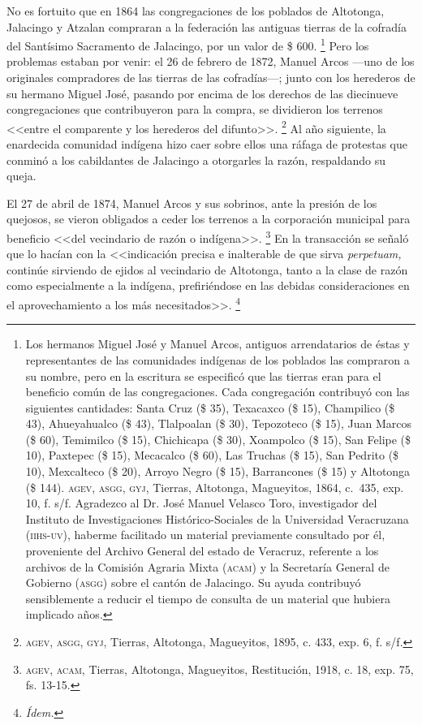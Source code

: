 \documentclass[14pt,twoside,final]{extbook} %
\let\oldfootnote\footnote
\renewcommand\footnote[1]{%
\oldfootnote{\hspace{1mm}#1}}
\begin{document}
No es fortuito que en 1864 las congregaciones de los poblados de Altotonga, Jalacingo y Atzalan compraran a la federación las antiguas tierras de la cofradía del Santísimo Sacramento de Jalacingo, por un valor de \$ 600.\footnote{Los hermanos Miguel José y Manuel Arcos, antiguos arrendatarios de éstas y representantes de las comunidades indígenas de los poblados las compraron a su nombre, pero en la escritura se especificó que las tierras eran para el beneficio común de las congregaciones. Cada congregación contribuyó con las siguientes cantidades: Santa Cruz (\$ 35), Texacaxco (\$ 15), Champilico (\$ 43), Ahueyahualco (\$ 43), Tlalpoalan (\$ 30), Tepozoteco (\$ 15), Juan Marcos (\$ 60), Temimilco (\$ 15), Chichicapa (\$ 30), Xoampolco (\$ 15), San Felipe (\$ 10), Paxtepec (\$ 15), Mecacalco (\$ 60), Las Truchas (\$ 15), San Pedrito (\$ 10), Mexcalteco (\$ 20), Arroyo Negro (\$ 15), Barrancones (\$ 15) y Altotonga (\$ 144). \textsc{agev}, \textsc{asgg}, \textsc{gyj}, Tierras, Altotonga, Magueyitos, 1864, c.~435, exp. 10, f. s/f. Agradezco al Dr. José Manuel Velasco Toro, investigador del Instituto de Investigaciones Histórico-Sociales de la Universidad Veracruzana (\textsc{iihs-uv}), haberme facilitado un material previamente consultado por él, proveniente del Archivo General del estado de Veracruz, referente a los archivos de la Comisión Agraria Mixta (\textsc{acam}) y la Secretaría General de Gobierno (\textsc{asgg}) sobre el cantón de Jalacingo. Su ayuda contribuyó sensiblemente a reducir el tiempo de consulta de un material que hubiera implicado años.} Pero los problemas estaban por venir: el 26 de febrero de 1872, Manuel Arcos ---uno de los originales compradores de las tierras de las cofradías---; junto con los herederos de su hermano Miguel José, pasando por encima de los derechos de las diecinueve congregaciones que contribuyeron para la compra, se dividieron los terrenos <<entre el comparente y los herederos del difunto>>.\footnote{\textsc{agev, asgg, gyj}, Tierras, Altotonga, Magueyitos, 1895, c. 433, exp. 6, f. s/f.} Al año siguiente, la enardecida comunidad indígena hizo caer sobre ellos una ráfaga de protestas que conminó a los cabildantes de Jalacingo a otorgarles la razón, respaldando su queja.

El 27 de abril de 1874, Manuel Arcos y sus sobrinos, ante la presión de los quejosos, se vieron obligados a ceder los terrenos a la corporación municipal para beneficio <<del vecindario de razón o indígena>>.\footnote{\textsc{agev, acam}, Tierras, Altotonga, Magueyitos, Restitución, 1918, c. 18, exp. 75, fs. 13-15.} En la transacción se señaló que lo hacían con la <<indicación precisa e inalterable de que sirva \emph{perpetuam,} continúe sirviendo de ejidos al vecindario de Altotonga, tanto a la clase de razón como especialmente a la indígena, prefiriéndose en las debidas consideraciones en el aprovechamiento a los más necesitados>>.\footnote{\em Ídem.}
\end{document}
